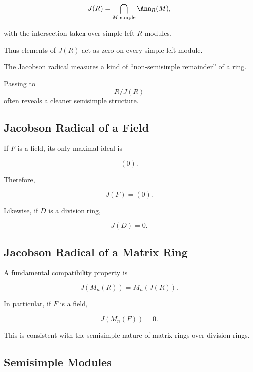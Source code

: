 \[ J(R)=\bigcap_{M\text{ simple}}\Ann_R(M), \]

with the intersection taken over simple left \(R\)-modules.

Thus elements of \(J(R)\) act as zero on every simple left module.

\begin{conceptbox}
The Jacobson radical measures a kind of ``non-semisimple remainder'' of a
ring.

Passing to
\[ R/J(R) \]
often reveals a cleaner semisimple structure.
\end{conceptbox}

\subsection{Jacobson Radical of a Field}
\label{subsec:jacobson-radical-field}

If \(F\) is a field, its only maximal ideal is

\[ (0). \]

Therefore,

\[ J(F)=(0). \]

Likewise, if \(D\) is a division ring,

\[ J(D)=0. \]

\subsection{Jacobson Radical of a Matrix Ring}
\label{subsec:jacobson-radical-matrix}

A fundamental compatibility property is

\[ J(M_n(R))=M_n(J(R)). \]

In particular, if \(F\) is a field,

\[ J(M_n(F))=0. \]

This is consistent with the semisimple nature of matrix rings over division
rings.

\subsection{Semisimple Modules}
\label{subsec:semisimple-modules}

